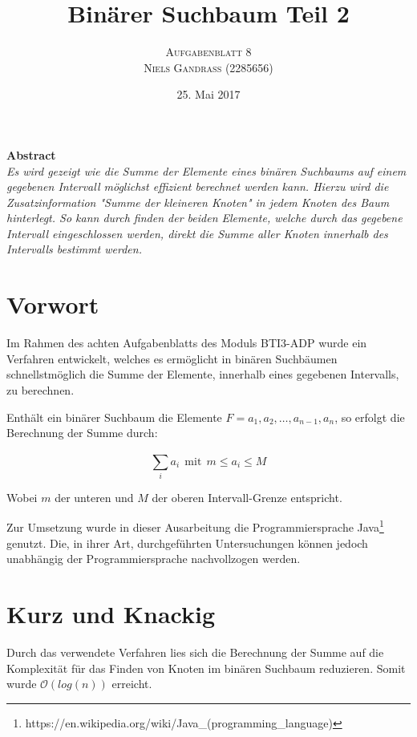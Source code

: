 \documentclass[paper=a4, fontsize=12pt]{article}
\title{\vspace{-15mm}\fontsize{24pt}{10pt}\selectfont\textbf{Binärer Suchbaum Teil 2}} %
\author{
\large
{\textsc{Aufgabenblatt 8}}\\[2mm]
{\textsc{Niels Gandraß (2285656)}}\\[2mm]
}
\date{25. Mai 2017} %
\begin{document}
\maketitle %
\thispagestyle{fancy} %


\begin{center}
	\textbf{Abstract}\\
	\textit{Es wird gezeigt wie die Summe der Elemente eines binären Suchbaums auf einem gegebenen Intervall möglichst effizient berechnet werden kann. Hierzu wird die Zusatzinformation "Summe der kleineren Knoten" in jedem Knoten des Baum hinterlegt. So kann durch finden der beiden Elemente, welche durch das gegebene Intervall eingeschlossen werden, direkt die Summe aller Knoten innerhalb des Intervalls bestimmt werden.}
\end{center}


\section{Vorwort}
Im Rahmen des achten Aufgabenblatts des Moduls BTI3-ADP wurde ein Verfahren entwickelt, welches es ermöglicht in binären Suchbäumen schnellstmöglich die Summe der Elemente, innerhalb eines gegebenen Intervalls, zu berechnen.

\begin{center}
	Enthält ein binärer Suchbaum die Elemente $F = a_1, a_2, \ldots, a_{n-1}, a_{n}$, so erfolgt die Berechnung der Summe durch:
\end{center}
$$ \sum_{i}^{} a_i ~~\text{mit}~~ m \leq a_i \leq M $$
\begin{center}
	Wobei $m$ der unteren und $M$ der oberen Intervall-Grenze entspricht.
\end{center}

\vspace{6pt}
Zur Umsetzung wurde in dieser Ausarbeitung die Programmiersprache Java\footnote{https://en.wikipedia.org/wiki/Java\_(programming\_language)} genutzt. Die, in ihrer Art, durchgeführten Untersuchungen können jedoch unabhängig der Programmiersprache nachvollzogen werden.

\section{Kurz und Knackig}
Durch das verwendete Verfahren lies sich die Berechnung der Summe auf die Komplexität für das Finden von Knoten im binären Suchbaum reduzieren. Somit wurde $\mathcal{O}(log(n))$ erreicht.
\end{document}
